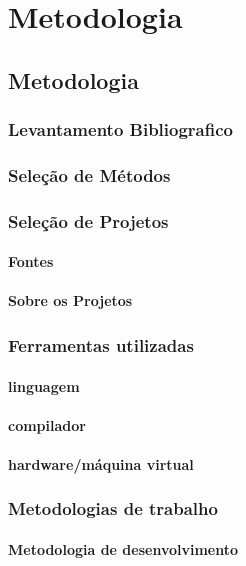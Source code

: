 \part{Metodologia}

\chapter[Metodologia]{Metodologia}

\section{Levantamento Bibliografico}

\section{Seleção de Métodos}

\section{Seleção de Projetos}
\subsection{Fontes}
\subsection{Sobre os Projetos}

\section{Ferramentas utilizadas}
\subsection{linguagem}
\subsection{compilador}
\subsection{hardware/máquina virtual}


\section{Metodologias de trabalho}
\subsection{Metodologia de desenvolvimento}

